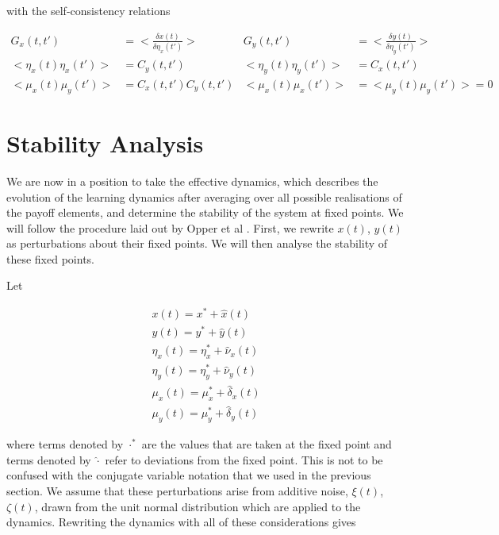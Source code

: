 \documentclass{article}
\begin{document}
with the self-consistency relations

\begin{align}
	G_x(t, t') &= <\frac{\delta x(t)}{\delta \eta_x(t')}> & G_y(t, t') &= <\frac{\delta y(t)}{\delta
	\eta_y(t')}> \\
	<\eta_x(t) \eta_x(t')> &= C_y(t, t') & <\eta_y(t) \eta_y(t')> &= C_x(t, t')\\
	<\mu_x(t) \mu_y(t')> &= C_x(t, t') C_y(t, t') & <\mu_x(t) \mu_x(t')> &= <\mu_y(t) \mu_y(t')> = 0
\end{align}

\section{Stability Analysis} %
\label{sec:stability_analysis}

We are now in a position to take the effective dynamics, which describes the evolution of the
learning dynamics after averaging over all possible realisations of the payoff elements, and
determine the stability of the system at fixed points. We will follow the procedure laid out by
Opper et al \cite{Opper}. First, we rewrite $x(t)$, $y(t)$ as perturbations about their fixed
points. We will then analyse the stability of these fixed points.

Let

\begin{align}
	x(t) = x^* + \hat{x}(t) \\
	y(t) = y^* + \hat{y}(t) \\
	\eta_x(t) = \eta_x^* + \hat{\nu}_x(t)\\
	\eta_y(t) = \eta_y^* + \hat{\nu}_y(t)\\
	\mu_x(t) = \mu_x^* + \hat{\delta}_x(t)\\
	\mu_y(t) = \mu_y^* + \hat{\delta}_y(t)
\end{align}

where terms denoted by $\cdot^*$ are the values that are taken at the fixed point and terms denoted
by $\hat{\cdot}$ refer to deviations from the fixed point. This is not to be confused with
the conjugate variable notation that we used in the previous section. We assume that these
perturbations arise from additive noise, $\xi(t)$, $\zeta(t)$, drawn from the unit normal
distribution which are applied to the dynamics. Rewriting the dynamics with all of these
considerations gives
\end{document}
